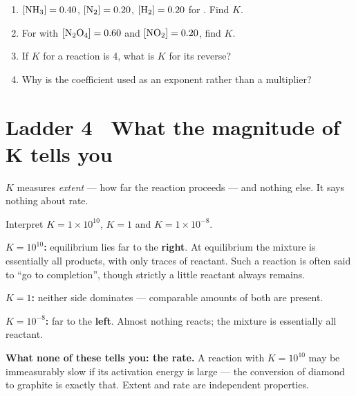 \documentclass{apchem-worksheet}
\begin{document}
\begin{yourturn}
\begin{enumerate}[leftmargin=*,itemsep=0.5em]
  \item $[\ce{NH3}] = 0.40$, $[\ce{N2}] = 0.20$, $[\ce{H2}] = 0.20$ for
        . Find $K$. \workspace[1.8cm]
  \item For  with $[\ce{N2O4}] = 0.60$ and
        $[\ce{NO2}] = 0.20$, find $K$. \workspace[1.6cm]
  \item If $K$ for a reaction is 4, what is $K$ for its reverse?
        \workspace[1.4cm]
  \item Why is the coefficient used as an exponent rather than a
        multiplier? \workspace[1.8cm]
\end{enumerate}
\end{yourturn}

\section*{\sffamily Ladder 4 \textbullet\ What the magnitude of K tells you}

$K$ measures \emph{extent} --- how far the reaction proceeds --- and
nothing else. It says nothing about rate.

\begin{workedexample}
Interpret $K = 1\times10^{10}$, $K = 1$ and
$K = 1\times10^{-8}$.

\textbf{$K = 10^{10}$:} equilibrium lies far to the \textbf{right}. At
equilibrium the mixture is essentially all products, with only traces of
reactant. Such a reaction is often said to ``go to completion'', though
strictly a little reactant always remains.

\textbf{$K = 1$:} neither side dominates --- comparable amounts of both are
present.

\textbf{$K = 10^{-8}$:} far to the \textbf{left}. Almost nothing reacts;
the mixture is essentially all reactant.

\textbf{What none of these tells you: the rate.} A reaction with
$K = 10^{10}$ may be immeasurably slow if its activation energy is large
--- the conversion of diamond to graphite is exactly that. Extent and rate
are independent properties.
\end{workedexample}
\end{document}
